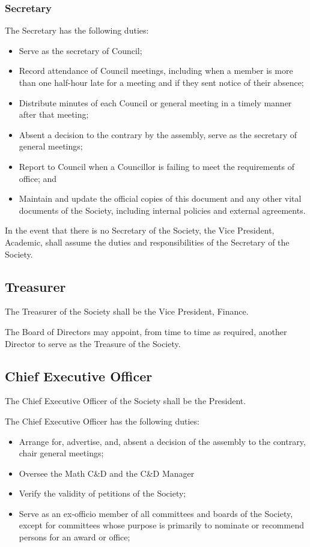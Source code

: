 \subsubsection{Secretary}
The Secretary has the following duties:
\begin{itemize}
  \item Serve as the secretary of Council;
  \item Record attendance of Council meetings, including when a member is more
    than one half-hour late for a meeting and if they sent notice of their
    absence;
  \item Distribute minutes of each Council or general meeting in a timely manner
    after that meeting;
  \item Absent a decision to the contrary by the assembly, serve as the
    secretary of general meetings;
  \item Report to Council when a Councillor is failing to meet the requirements
    of office; and
  \item Maintain and update the official copies of this document and any other
    vital documents of the Society, including internal policies and external
    agreements.
\end{itemize}

In the event that there is no Secretary of the Society, the Vice President, Academic,
shall assume the duties and responsibilities of the Secretary of the Society.

\subsection{Treasurer}
The Treasurer of the Society shall be the Vice President, Finance. 

The Board of Directors may appoint, from time to time as required, another Director
to serve as the Treasure of the Society. 

\subsection{Chief Executive Officer}
The Chief Executive Officer of the Society shall be the President.

The Chief Executive Officer has the following duties:
\begin{itemize}
  \item Arrange for, advertise, and, absent a decision of the assembly to the
    contrary, chair general meetings;
  \item Oversee the Math C\&D and the C\&D Manager
  \item Verify the validity of petitions of the Society;
  \item Serve as an ex-officio member of all committees and boards of the
    Society, except for committees whose purpose is primarily to nominate or
    recommend persons for an award or office;
\end{itemize}
